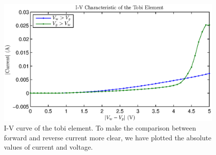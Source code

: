 \begin{figure}[H]
	\center
	\includegraphics{tobi.eps}
	\caption{I-V curve of the tobi element. To make the comparison between forward and reverse current more clear, we have plotted the absolute values of current and voltage.}
	\label{fig:tobi}
\end{figure}


